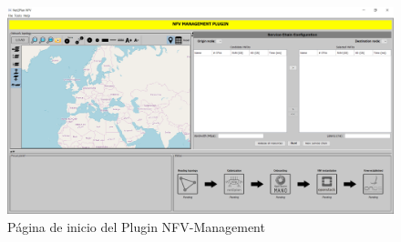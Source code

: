 \begin{figure}[!ht]
	\centering
	\includegraphics[width=0.8\linewidth]{imagenes/nfvplugin_dashboard}
	\caption{Página de inicio del Plugin NFV-Management}
	\label{fig:nfvplugindash}
\end{figure}






\cleardoublepage